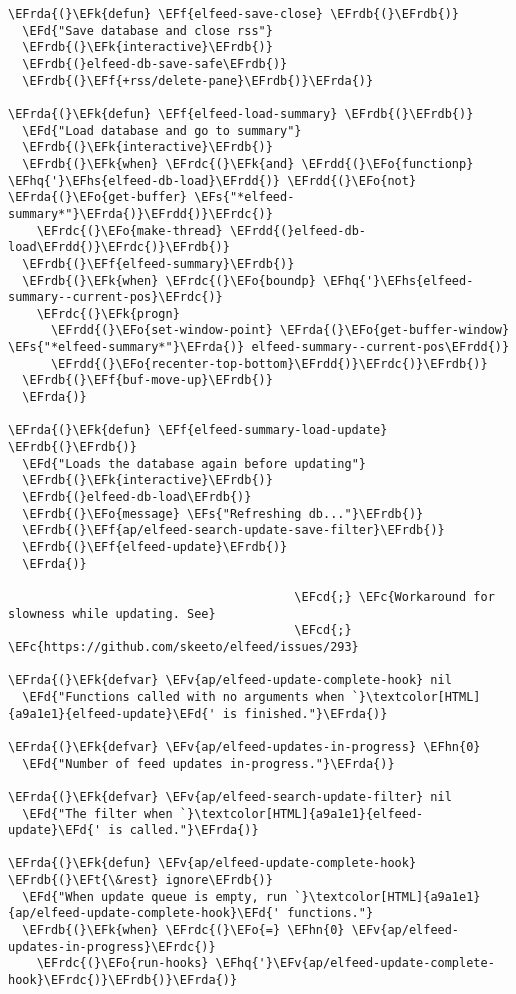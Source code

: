 \documentclass[a4wide,10pt]{article}
\newcommand{\EFc}[1]{\textcolor{EFc}{#1}} %
\newcommand{\EFcd}[1]{\textcolor{EFcd}{#1}} %
\newcommand{\EFs}[1]{\textcolor{EFs}{#1}} %
\newcommand{\EFd}[1]{\textcolor{EFd}{#1}} %
\newcommand{\EFk}[1]{\textcolor{EFk}{#1}} %
\newcommand{\EFf}[1]{\textcolor{EFf}{#1}} %
\newcommand{\EFv}[1]{\textcolor{EFv}{#1}} %
\newcommand{\EFt}[1]{\textcolor{EFt}{#1}} %
\newcommand{\EFo}[1]{\textcolor{EFo}{#1}} %
\newcommand{\EFhn}[1]{\textcolor{EFhn}{\textbf{#1}}} %
\newcommand{\EFhq}[1]{\textcolor{EFhq}{#1}} %
\newcommand{\EFhs}[1]{\textcolor{EFhs}{#1}} %
\newcommand{\EFrda}[1]{\textcolor{EFrda}{#1}} %
\newcommand{\EFrdb}[1]{\textcolor{EFrdb}{#1}} %
\newcommand{\EFrdc}[1]{\textcolor{EFrdc}{#1}} %
\newcommand{\EFrdd}[1]{\textcolor{EFrdd}{#1}} %
\begin{document}
\begin{Code}
\begin{Verbatim}
\EFrda{(}\EFk{defun} \EFf{elfeed-save-close} \EFrdb{(}\EFrdb{)}
  \EFd{"Save database and close rss"}
  \EFrdb{(}\EFk{interactive}\EFrdb{)}
  \EFrdb{(}elfeed-db-save-safe\EFrdb{)}
  \EFrdb{(}\EFf{+rss/delete-pane}\EFrdb{)}\EFrda{)}

\EFrda{(}\EFk{defun} \EFf{elfeed-load-summary} \EFrdb{(}\EFrdb{)}
  \EFd{"Load database and go to summary"}
  \EFrdb{(}\EFk{interactive}\EFrdb{)}
  \EFrdb{(}\EFk{when} \EFrdc{(}\EFk{and} \EFrdd{(}\EFo{functionp} \EFhq{'}\EFhs{elfeed-db-load}\EFrdd{)} \EFrdd{(}\EFo{not} \EFrda{(}\EFo{get-buffer} \EFs{"*elfeed-summary*"}\EFrda{)}\EFrdd{)}\EFrdc{)}
    \EFrdc{(}\EFo{make-thread} \EFrdd{(}elfeed-db-load\EFrdd{)}\EFrdc{)}\EFrdb{)}
  \EFrdb{(}\EFf{elfeed-summary}\EFrdb{)}
  \EFrdb{(}\EFk{when} \EFrdc{(}\EFo{boundp} \EFhq{'}\EFhs{elfeed-summary--current-pos}\EFrdc{)}
    \EFrdc{(}\EFk{progn}
      \EFrdd{(}\EFo{set-window-point} \EFrda{(}\EFo{get-buffer-window} \EFs{"*elfeed-summary*"}\EFrda{)} elfeed-summary--current-pos\EFrdd{)}
      \EFrdd{(}\EFo{recenter-top-bottom}\EFrdd{)}\EFrdc{)}\EFrdb{)}
  \EFrdb{(}\EFf{buf-move-up}\EFrdb{)}
  \EFrda{)}

\EFrda{(}\EFk{defun} \EFf{elfeed-summary-load-update} \EFrdb{(}\EFrdb{)}
  \EFd{"Loads the database again before updating"}
  \EFrdb{(}\EFk{interactive}\EFrdb{)}
  \EFrdb{(}elfeed-db-load\EFrdb{)}
  \EFrdb{(}\EFo{message} \EFs{"Refreshing db..."}\EFrdb{)}
  \EFrdb{(}\EFf{ap/elfeed-search-update-save-filter}\EFrdb{)}
  \EFrdb{(}\EFf{elfeed-update}\EFrdb{)}
  \EFrda{)}

                                        \EFcd{;} \EFc{Workaround for slowness while updating. See}
                                        \EFcd{;} \EFc{https://github.com/skeeto/elfeed/issues/293}

\EFrda{(}\EFk{defvar} \EFv{ap/elfeed-update-complete-hook} nil
  \EFd{"Functions called with no arguments when `}\textcolor[HTML]{a9a1e1}{elfeed-update}\EFd{' is finished."}\EFrda{)}

\EFrda{(}\EFk{defvar} \EFv{ap/elfeed-updates-in-progress} \EFhn{0}
  \EFd{"Number of feed updates in-progress."}\EFrda{)}

\EFrda{(}\EFk{defvar} \EFv{ap/elfeed-search-update-filter} nil
  \EFd{"The filter when `}\textcolor[HTML]{a9a1e1}{elfeed-update}\EFd{' is called."}\EFrda{)}

\EFrda{(}\EFk{defun} \EFv{ap/elfeed-update-complete-hook} \EFrdb{(}\EFt{\&rest} ignore\EFrdb{)}
  \EFd{"When update queue is empty, run `}\textcolor[HTML]{a9a1e1}{ap/elfeed-update-complete-hook}\EFd{' functions."}
  \EFrdb{(}\EFk{when} \EFrdc{(}\EFo{=} \EFhn{0} \EFv{ap/elfeed-updates-in-progress}\EFrdc{)}
    \EFrdc{(}\EFo{run-hooks} \EFhq{'}\EFv{ap/elfeed-update-complete-hook}\EFrdc{)}\EFrdb{)}\EFrda{)}


\end{Verbatim}
\end{Code}
\end{document}
